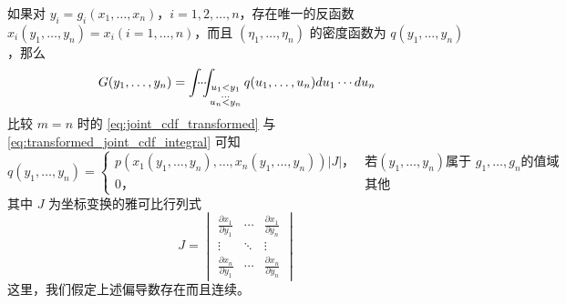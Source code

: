 \begin{proposition}[随机变量函数的分布]\label{prop:随机变量函数的分布}
    如果对 $y_i=g_i(x_1,\ldots,x_n)$，$i=1,2,\ldots,n$，存在唯一的反函数 $x_i(y_1,\ldots,y_n)=x_i(i=1,\ldots,n)$，而且 $(\eta_1,\ldots,\eta_n)$ 的密度函数为 $q(y_1,\ldots,y_n)$，那么
\begin{equation} \label{eq:transformed_joint_cdf_integral}
G(y_1,\ldots,y_n) = \idotsint_{\substack{u_1<y_1 \\ \ldots \\ u_n<y_n}} q(u_1,\ldots,u_n) du_1\cdots du_n
\end{equation}比较 $m=n$ 时的 \eqref{eq:joint_cdf_transformed} 与 \eqref{eq:transformed_joint_cdf_integral} 可知
\begin{equation} \label{eq:transformed_joint_pdf}
q(y_1,\ldots,y_n) = \begin{cases} p(x_1(y_1,\ldots,y_n),\ldots,x_n(y_1,\ldots,y_n))|J|，& \text{若}(y_1,\ldots,y_n)\text{属于 }g_1,\ldots,g_n\text{的值域} \\ 0，& \text{其他} \end{cases}
\end{equation}
其中 $J$ 为坐标变换的雅可比行列式
\begin{equation} \label{eq:jacobian_determinant}
J=
\begin{vmatrix}
\frac{\partial x_1}{\partial y_1} & \cdots & \frac{\partial x_1}{\partial y_n} \\
\vdots & \ddots & \vdots \\
\frac{\partial x_n}{\partial y_1} & \cdots & \frac{\partial x_n}{\partial y_n}
\end{vmatrix}
\end{equation}
这里，我们假定上述偏导数存在而且连续。
\end{proposition}

